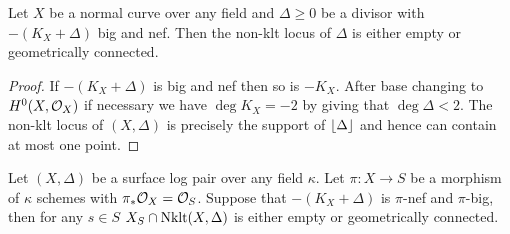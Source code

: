 \begin{lemma}
	Let $X$ be a normal curve over any field and $\Delta \geq 0 $ be a divisor with $-(K_{X}+\Delta)$ big and nef. Then the non-klt locus of $\Delta$ is either empty or geometrically connected. 
\end{lemma}

\begin{proof}
	If $-(K_{X}+\Delta)$ is big and nef then so is $-K_{X}$. After base changing to $H^{0}(X,\mathcal{O}_{X})$ if necessary we have $\deg K_{X} = -2$ by \cite[Corollary 2.8]{tanaka2018minimal} giving that $ \deg \Delta <2$. The non-klt locus of $(X,\Delta)$ is precisely the support of $\lfloor \Delta \rfloor$ and hence can contain at most one point.
\end{proof}

\begin{theorem}\cite[Theorem 5.2]{tanaka2018minimal}\label{Tcl}
	Let $(X,\Delta)$ be a surface log pair over any field $\kappa$. Let $\pi\colon X \to S$ be a morphism of $\kappa$ schemes with $\pi_{*}\mathcal{O}_{X} =\mathcal{O}_{S}$. Suppose that $-(K_{X}+\Delta)$ is $\pi$-nef and $\pi$-big, then for any $s \in S$ $X_{S}\cap \text{Nklt}(X,\Delta)$ is either empty or geometrically connected. 
\end{theorem}


